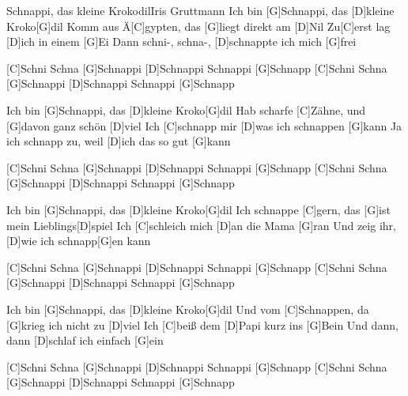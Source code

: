 \documentclass[../main.tex]{subfiles}
\begin{document}
\begin{song}{Schnappi, das kleine Krokodil}{Iris Gruttmann}{}
Ich bin [G]Schnappi, das [D]kleine Kroko[G]dil
Komm aus Ä[C]gypten, das [G]liegt direkt am [D]Nil
Zu[C]erst lag [D]ich in einem [G]Ei
Dann schni-, schna-, [D]schnappte ich mich [G]frei

[C]Schni Schna [G]Schnappi [D]Schnappi Schnappi [G]Schnapp
[C]Schni Schna [G]Schnappi [D]Schnappi Schnappi [G]Schnapp

Ich bin [G]Schnappi, das [D]kleine Kroko[G]dil
Hab scharfe [C]Zähne, und [G]davon ganz schön [D]viel
Ich [C]schnapp mir [D]was ich schnappen [G]kann
Ja ich schnapp zu, weil [D]ich das so gut [G]kann

[C]Schni Schna [G]Schnappi [D]Schnappi Schnappi [G]Schnapp
[C]Schni Schna [G]Schnappi [D]Schnappi Schnappi [G]Schnapp

Ich bin [G]Schnappi, das [D]kleine Kroko[G]dil
Ich schnappe [C]gern, das [G]ist mein Lieblings[D]spiel
Ich [C]schleich mich [D]an die Mama [G]ran
Und zeig ihr, [D]wie ich schnapp[G]en kann

[C]Schni Schna [G]Schnappi [D]Schnappi Schnappi [G]Schnapp
[C]Schni Schna [G]Schnappi [D]Schnappi Schnappi [G]Schnapp

Ich bin [G]Schnappi, das [D]kleine Kroko[G]dil
Und vom [C]Schnappen, da [G]krieg ich nicht zu [D]viel
Ich [C]beiß dem [D]Papi kurz ins [G]Bein
Und dann, dann [D]schlaf ich einfach [G]ein

[C]Schni Schna [G]Schnappi [D]Schnappi Schnappi [G]Schnapp
[C]Schni Schna [G]Schnappi [D]Schnappi Schnappi [G]Schnapp

\end{song}
\end{document}
